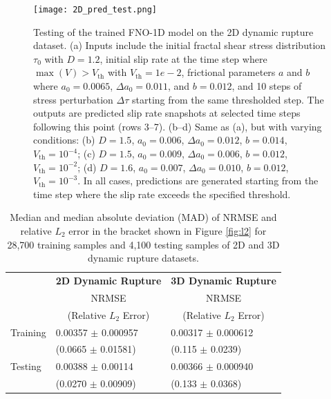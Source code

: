 \documentclass[draft]{agujournal2019}
\begin{document}
\begin{figure}
\centering
\texttt{[image: 2D\_pred\_test.png]}
\caption{\label{fig:fno_1D_test}Testing of the trained FNO-1D model on the 2D dynamic rupture dataset.  
(a) Inputs include the initial fractal shear stress distribution \(\tau_0\) with \(D = 1.2\), initial slip rate at the time step where \(\max(V) > V_{\text{th}}\) with \(V_{\text{th}} = 1e-2\), frictional parameters \(a\) and \(b\) where \(a_0 = 0.0065\), \(\Delta a_0 = 0.011\), and \(b = 0.012\), and 10 steps of stress perturbation \(\Delta \tau\) starting from the same thresholded step. The outputs are predicted slip rate snapshots at selected time steps following this point (rows 3--7).  
(b--d) Same as (a), but with varying conditions:  
(b) \(D = 1.5\), \(a_0 = 0.006\), \(\Delta a_0 = 0.012\), \(b = 0.014\), \(V_{\text{th}} = 10^{-4}\);  
(c) \(D = 1.5\), \(a_0 = 0.009\), \(\Delta a_0 = 0.006\), \(b = 0.012\), \(V_{\text{th}} = 10^{-2}\);  
(d) \(D = 1.6\), \(a_0 = 0.007\), \(\Delta a_0 = 0.010\), \(b = 0.012\), \(V_{\text{th}} = 10^{-3}\).  
In all cases, predictions are generated starting from the time step where the slip rate exceeds the specified threshold.
}
\end{figure}

\begin{table}
\caption{Median and median absolute deviation (MAD) of NRMSE and relative \(L_2\) error in the bracket shown in Figure \ref{fig:l2} for 28,700 training samples and 4,100 testing samples of 2D and 3D dynamic rupture datasets.}
    \centering
    { %
    \begin{tabular}{lll}
        \toprule
        \multirow{3}{*}{} & \multicolumn{1}{c}{\textbf{2D Dynamic Rupture}} & \multicolumn{1}{c}{\textbf{3D Dynamic Rupture}} \\
        & \multicolumn{1}{c}{NRMSE} & \multicolumn{1}{c}{NRMSE} \\
        & \multicolumn{1}{c}{(Relative \( L_2 \) Error)} & \multicolumn{1}{c}{(Relative \( L_2 \) Error)} \\
        \midrule
        Training& 0.00357 $\pm$  0.000957 & 0.00317 $\pm$  0.000612 \\
         & (0.0665 $\pm$  0.01581) & (0.115 $\pm$ 0.0239) \\
        Testing & 0.00388 $\pm$  0.00114 &  0.00366 $\pm$  0.000940\\
         & (0.0270 $\pm$ 0.00909)  & (0.133 $\pm$ 0.0368) \\
        \bottomrule
    \end{tabular}
    }
    \label{tab:relative_l2_error}
\end{table}
\end{document}
